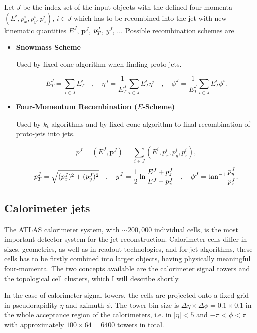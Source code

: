Let $J$ be the index set of the input objects with the defined four-momenta
$(E^i,p_x^i,p_y^i,p_z^i)$, $i \in J$ which has to be recombined into the jet
with new kinematic quantities $E^J$, $\mathbf{p}^J$, $p_{T}^J$, $y^J$, $\ldots$
Possible recombination schemes are

\begin{itemize}
\item \textbf{Snowmass Scheme}

Used by fixed cone algorithm when finding proto-jets.

\begin{equation}
  E_T^J = \sum_{i \in J} E_T^i
  \quad , \quad
  \eta^J = \frac{1}{E_T^J} \sum_{i \in J} E_T^i \eta^i
  \quad , \quad
  \phi^J = \frac{1}{E_T^J} \sum_{i \in J} E_T^i \phi^i.
\end{equation}

\item \textbf{Four-Momentum Recombination ($E$-Scheme)}

Used by $k_t$-algorithms and by fixed cone algorithm to final recombination of
proto-jets into jets.

\begin{equation}
  p^J = ( E^J, \mathbf{p}^J ) = \sum_{i \in J} (E^i,p_x^i,p_y^i,p_z^i),
\end{equation}
\begin{equation}
  p_{T}^J = \sqrt{(p_x^J)^2 + (p_y^J)^2}
  \quad , \quad
  y^J = \frac{1}{2} \ln \frac{E^J + p_z^J}{E^J - p_z^J}
  \quad , \quad
  \phi^J = \tan^{-1} \frac{p_y^J}{p_x^J}.
\end{equation}
\end{itemize}

\subsection{Calorimeter jets}
\label{sse:CalorimeterJets}

The ATLAS calorimeter system, with $\sim 200,000$ individual cells, is the most
important detector system for the jet reconstruction. Calorimeter cells differ
in sizes, geometries, as well as in readout technologies, and for jet algorithms,
these cells has to be firstly combined into larger objects, having physically
meaningful four-momenta. The two concepts available are the calorimeter signal
towers and the topological cell clusters, which I will describe shortly.

In the case of calorimeter signal towers, the cells are projected onto a fixed
grid in pseudorapidity $\eta$ and azimuth $\phi$. The tower bin size is $\Delta
\eta \times \Delta \phi = 0.1 \times 0.1$ in the whole acceptance region of the
calorimeters, i.e. in $|\eta| < 5$ and $- \pi < \phi < \pi$ with approximately 
$100 \times 64 = 6400$ towers in total.

